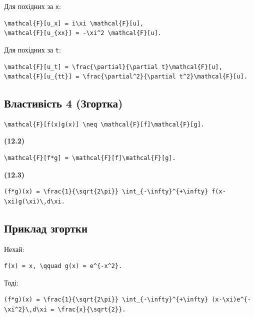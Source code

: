 \documentclass[
  ukrainian,
]{article}
\begin{document}
Для похідних за \texttt{x}:

\begin{verbatim}
\mathcal{F}[u_x] = i\xi \mathcal{F}[u],
\mathcal{F}[u_{xx}] = -\xi^2 \mathcal{F}[u].
\end{verbatim}

Для похідних за \texttt{t}:

\begin{verbatim}
\mathcal{F}[u_t] = \frac{\partial}{\partial t}\mathcal{F}[u],
\mathcal{F}[u_{tt}] = \frac{\partial^2}{\partial t^2}\mathcal{F}[u].
\end{verbatim}

\subsection{Властивість 4
(Згортка)}\label{ux432ux43bux430ux441ux442ux438ux432ux456ux441ux442ux44c-4-ux437ux433ux43eux440ux442ux43aux430}

\begin{verbatim}
\mathcal{F}[f(x)g(x)] \neq \mathcal{F}[f]\mathcal{F}[g].
\end{verbatim}

\textbf{(12.2)}

\begin{verbatim}
\mathcal{F}[f*g] = \mathcal{F}[f]\mathcal{F}[g].
\end{verbatim}

\textbf{(12.3)}

\begin{verbatim}
(f*g)(x) = \frac{1}{\sqrt{2\pi}} \int_{-\infty}^{+\infty} f(x-\xi)g(\xi)\,d\xi.
\end{verbatim}

\subsection{Приклад
згортки}\label{ux43fux440ux438ux43aux43bux430ux434-ux437ux433ux43eux440ux442ux43aux438}

Нехай:

\begin{verbatim}
f(x) = x, \qquad g(x) = e^{-x^2}.
\end{verbatim}

Тоді:

\begin{verbatim}
(f*g)(x) = \frac{1}{\sqrt{2\pi}} \int_{-\infty}^{+\infty} (x-\xi)e^{-\xi^2}\,d\xi = \frac{x}{\sqrt{2}}.
\end{verbatim}
\end{document}
